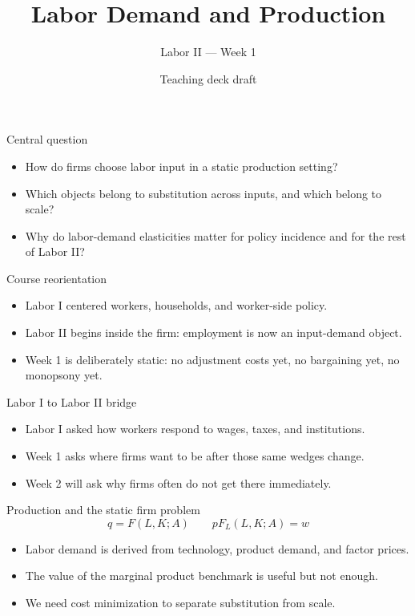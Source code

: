 \documentclass[aspectratio=169,11pt]{beamer}
\title{Labor Demand and Production}
\subtitle{Labor II --- Week 1}
\author{Teaching deck draft}
\date{}
\begin{document}
\begin{frame}
  \titlepage
\end{frame}

\begin{frame}{Central question}
\begin{itemize}
    \item How do firms choose labor input in a static production setting?
    \item Which objects belong to substitution across inputs, and which belong to scale?
    \item Why do labor-demand elasticities matter for policy incidence and for the rest of Labor II?
\end{itemize}
\end{frame}

\begin{frame}{Course reorientation}
\begin{itemize}
    \item Labor I centered workers, households, and worker-side policy.
    \item Labor II begins inside the firm: employment is now an input-demand object.
    \item Week 1 is deliberately static: no adjustment costs yet, no bargaining yet, no monopsony yet.
\end{itemize}
\end{frame}

\begin{frame}{Labor I to Labor II bridge}
\begin{itemize}
    \item Labor I asked how workers respond to wages, taxes, and institutions.
    \item Week 1 asks where firms want to be after those same wedges change.
    \item Week 2 will ask why firms often do not get there immediately.
\end{itemize}
\end{frame}

\begin{frame}{Production and the static firm problem}
\[
q = F(L,K;A)
\qquad
pF_L(L,K;A)=w
\]

\begin{itemize}
    \item Labor demand is derived from technology, product demand, and factor prices.
    \item The value of the marginal product benchmark is useful but not enough.
    \item We need cost minimization to separate substitution from scale.
\end{itemize}
\end{frame}
\end{document}
